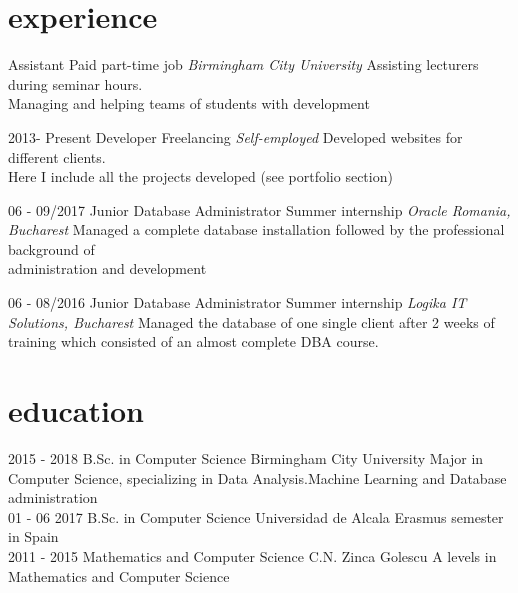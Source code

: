 \documentclass[]{friggeri-cv}
\begin{document}
\section{experience}
\begin{entrylist}

    { Assistant}
    {Paid part-time job}
    {
    \emph{Birmingham City University}
    Assisting lecturers during seminar hours.
   \\Managing and helping teams of students with development}

    
    \entry
  {2013- Present}
  {Developer}
  {Freelancing}
  {\emph {Self-employed} 
    Developed websites for different clients.
      \\ Here I include all the projects developed (see portfolio section)}
    
     \entry
  {06 - 09/2017}
  {Junior Database Administrator} 
  {Summer internship}
  {\emph {Oracle Romania, Bucharest}
    Managed a complete database installation followed by the professional background of\\ administration and development}
    
    \entry
  {06 - 08/2016}
  {Junior Database Administrator} 
  {Summer internship}
  {\emph {Logika IT Solutions, Bucharest}
  Managed the database of one single client after 2 weeks of training which consisted of an almost complete DBA course.}

\end{entrylist}

\section{education}
\begin{entrylist}
  \entry
  {2015 - 2018}
  {B.Sc. in Computer Science}
  {Birmingham City University}
  {Major in Computer Science, specializing in Data Analysis.Machine Learning and Database administration
  }
  \\
  \entry
  {01 - 06 2017}
  {B.Sc. in Computer Science }
  {Universidad de Alcala}
  { Erasmus semester in Spain }
  \\
  \entry
  {2011 - 2015}
  {Mathematics and Computer Science}
  {C.N. Zinca Golescu}
  {A levels in Mathematics and Computer Science}

  \end{entrylist}


\newpage
\end{document}
